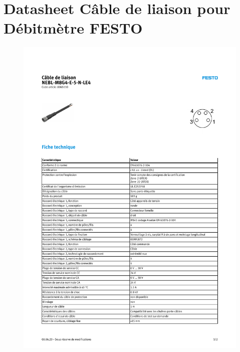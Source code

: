 \documentclass[
    iai & comatec, %
    mi, %
]{heig-tb}
\begin{document}
\section{Datasheet Câble de liaison pour Débitmètre FESTO}
\begin{figure}[H]
    \hspace{-1cm}
    \includegraphics[scale = 0.85, page = 1]{assets/pdf/Festo_Cable_liaison.pdf}
\end{figure}

\end{document}
